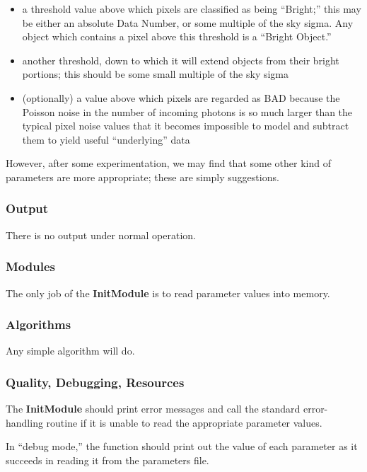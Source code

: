 \begin{itemize}
  \item a threshold value above which pixels are classified as being
        ``Bright;''  this may be either an absolute Data Number,
        or some multiple of the sky sigma.  Any object which contains
        a pixel above this threshold is a ``Bright Object.''
  \item another threshold, down to which it will extend objects from their
        bright portions;  this should be some small multiple of the sky
        sigma
  \item (optionally) a value above which pixels are regarded as BAD
        because the Poisson noise in the number of incoming photons is
        so much larger than the typical pixel noise values that it
        becomes impossible to model and subtract them to yield useful
        ``underlying'' data
\end{itemize}

  However, after some experimentation, we may find that some other
kind of parameters are more appropriate; these are simply suggestions.

\subsubsection {Output}

  There is no output under normal operation.

\subsubsection {Modules}

  The only job of the {\bf InitModule} is to read parameter values
into memory.

\subsubsection {Algorithms}

  Any simple algorithm will do.

\subsubsection {Quality, Debugging, Resources}

  The {\bf InitModule} should print error messages and call the standard
error-handling routine if it is unable to read the appropriate parameter
values.

  In ``debug mode,'' the function should print out the value of
each parameter as it succeeds in reading it from the parameters file.

